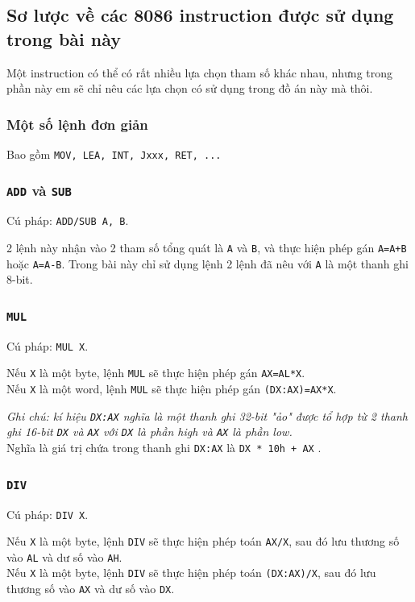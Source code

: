 \documentclass[12pt, final]{article}
\newcommand{\code}[1]{\texttt{#1}}
\begin{document}
\subsection{Sơ lược về các 8086 instruction được sử dụng trong bài này\cite{8086instruction}}
Một instruction có thể có rất nhiều lựa chọn tham số khác nhau, nhưng trong phần này em sẽ chỉ nêu các lựa chọn có sử dụng trong đồ án này mà thôi.

\subsubsection{Một số lệnh đơn giản}
Bao gồm \code{MOV, LEA, INT, Jxxx, RET, ...}

\subsubsection{\code{ADD} và \code{SUB}}

Cú pháp: \code{ADD/SUB A, B}. 

2 lệnh này nhận vào 2 tham số tổng quát là \code{A} và \code{B}, và thực hiện phép gán \code{A=A+B} hoặc \code{A=A-B}.
Trong bài này chỉ sử dụng lệnh 2 lệnh đã nêu với \code{A} là một thanh ghi 8-bit. 

\subsubsection{\code{MUL}}
Cú pháp: \code{MUL X}.

Nếu \code{X} là một byte, lệnh \code{MUL} sẽ thực hiện phép gán \code{AX=AL*X}.\\
Nếu \code{X} là một word, lệnh \code{MUL} sẽ thực hiện phép gán \code{(DX:AX)=AX*X}.

\textit{Ghi chú: kí hiệu \code{DX:AX} nghĩa là một thanh ghi 32-bit "ảo" được tổ hợp từ 2 thanh ghi 16-bit \code{DX} và \code{AX} với \code{DX} là phần high và \code{AX} là phần low.}\\
Nghĩa là giá trị chứa trong thanh ghi \code{DX:AX} là \code{DX * 10h + AX} \cite{asmbeginner}. 

\subsubsection{\code{DIV}}
Cú pháp: \code{DIV X}.

Nếu \code{X} là một byte, lệnh \code{DIV} sẽ thực hiện phép toán \code{AX/X}, sau đó lưu thương số vào \code{AL} và dư số vào \code{AH}.\\
Nếu \code{X} là một byte, lệnh \code{DIV} sẽ thực hiện phép toán \code{(DX:AX)/X}, sau đó lưu thương số vào \code{AX} và dư số vào \code{DX}.
\end{document}
